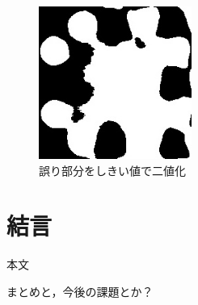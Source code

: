 \documentclass[openright]{nitocs}
\numberwithin{equation}{section}
\begin{document}
                \begin{figure}[tb] %
                    \begin{center}
                    \includegraphics[width=50mm,height=50mm]{DSC_0098/TRIM_inRange_WHITE.jpg} 
                    \caption{誤り部分をしきい値で二値化}
                    \label{ex3_error_area}
                    \end{center}
                \end{figure}






    \section{結言}\label{sec:Item} %
        本文

        まとめと，今後の課題とか？

            
            
\end{document}
